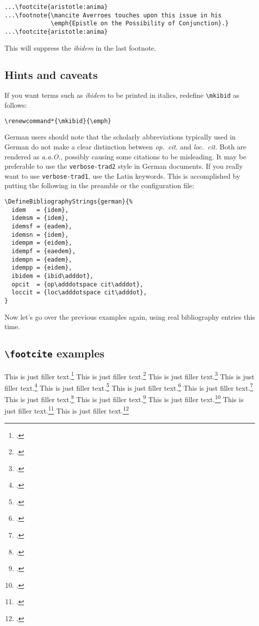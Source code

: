 \documentclass[a4paper]{article}
\newcommand*{\cmd}[1]{\texttt{\textbackslash #1}}
\begin{document}
\begin{verbatim}
...\footcite{aristotle:anima}
...\footnote{\mancite Averroes touches upon this issue in his
             \emph{Epistle on the Possibility of Conjunction}.}
...\footcite{aristotle:anima}
\end{verbatim}
%
This will suppress the \emph{ibidem} in the last footnote.

\subsection*{Hints and caveats}

If you want terms such as \emph{ibidem} to be printed in italics,
redefine \cmd{mkibid} as follows:

\begin{verbatim}
\renewcommand*{\mkibid}{\emph}
\end{verbatim}
%
German users should note that the scholarly abbreviations typically
used in German do not make a clear distinction between
\emph{op.~cit.} and \emph{loc.~cit.} Both are rendered as
\emph{a.a.O.}, possibly causing some citations to be misleading. It
may be preferable to use the \texttt{verbose-trad2} style in German
documents. If you really want to use \texttt{verbose-trad1}, use the
Latin keywords. This is accomplished by putting the following in the
preamble or the configuration file:

\begin{verbatim}
\DefineBibliographyStrings{german}{%
  idem   = {idem},
  idemsm = {idem},
  idemsf = {eadem},
  idemsn = {idem},
  idempm = {eidem},
  idempf = {eaedem},
  idempn = {eadem},
  idempp = {eidem},
  ibidem = {ibid\adddot},
  opcit  = {op\adddotspace cit\adddot},
  loccit = {loc\adddotspace cit\adddot},
}
\end{verbatim}
%
Now let's go over the previous examples again, using real
bibliography entries this time.

\clearpage

\subsection*{\cmd{footcite} examples}

This is just filler text.\footcite{aristotle:anima}
This is just filler text.\footcite{averroes/bland}
This is just filler text.\footcite[26]{aristotle:anima}
This is just filler text.\footcite[59--61]{averroes/bland}
This is just filler text.\footcite[26]{aristotle:anima}
This is just filler text.\footcite[59--61]{averroes/bland}
This is just filler text.\footcite{aristotle:physics}
This is just filler text.\footcite{averroes/bland}
This is just filler text.\footcite{aristotle:anima}
This is just filler text.\footcite[55]{aristotle:physics}
This is just filler text.\footcite[25]{aristotle:physics}
This is just filler text.\footcite[25]{aristotle:physics}
\end{document}
